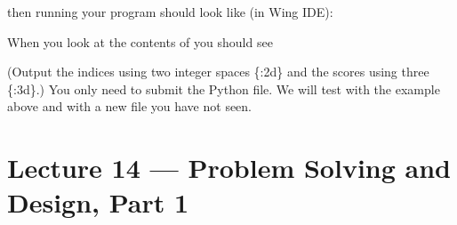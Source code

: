 \documentclass[letterpaper,10pt,english]{sphinxmanual}
\begin{document}
\begin{enumerate}
then running your program should look like (in Wing IDE):

%
\begin{sphinxVerbatim}[commandchars=\\\{\}]
    
    
\end{sphinxVerbatim}

When you look at the contents of  you should
see

%
\begin{sphinxVerbatim}[commandchars=\\\{\}]
  
  
  
  
  
  
  
 
\end{sphinxVerbatim}

(Output the indices using two integer spaces \{:2d\} and the scores using
three \{:3d\}.) You only need to submit the Python file.  We will test with the
example above and with a new file you have not seen.

\end{enumerate}


\chapter{Lecture 14 — Problem Solving and Design, Part 1}
\label{\detokenize{lecture_notes/lec14_design_part1:lecture-14-problem-solving-and-design-part-1}}\label{\detokenize{lecture_notes/lec14_design_part1::doc}}
\end{document}
